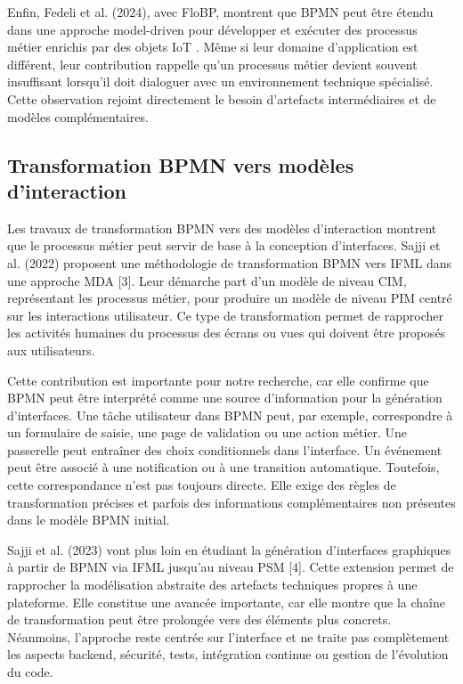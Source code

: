 Enfin, Fedeli et al. (2024), avec FloBP, montrent que BPMN peut être étendu dans une approche model-driven pour développer et exécuter des processus métier enrichis par des objets IoT \cite{fedeli2024}. Même si leur domaine d'application est différent, leur contribution rappelle qu'un processus métier devient souvent insuffisant lorsqu'il doit dialoguer avec un environnement technique spécialisé. Cette observation rejoint directement le besoin d'artefacts intermédiaires et de modèles complémentaires.


\subsection{Transformation BPMN vers modèles d'interaction}

Les travaux de transformation BPMN vers des modèles d'interaction montrent que le processus métier peut servir de base à la conception d'interfaces. Sajji et al. (2022) proposent une méthodologie de transformation BPMN vers IFML dans une approche MDA [3]. Leur démarche part d'un modèle de niveau CIM, représentant les processus métier, pour produire un modèle de niveau PIM centré sur les interactions utilisateur. Ce type de transformation permet de rapprocher les activités humaines du processus des écrans ou vues qui doivent être proposés aux utilisateurs.

Cette contribution est importante pour notre recherche, car elle confirme que BPMN peut être interprété comme une source d'information pour la génération d'interfaces. Une tâche utilisateur dans BPMN peut, par exemple, correspondre à un formulaire de saisie, une page de validation ou une action métier. Une passerelle peut entraîner des choix conditionnels dans l'interface. Un événement peut être associé à une notification ou à une transition automatique. Toutefois, cette correspondance n'est pas toujours directe. Elle exige des règles de transformation précises et parfois des informations complémentaires non présentes dans le modèle BPMN initial.

Sajji et al. (2023) vont plus loin en étudiant la génération d'interfaces graphiques à partir de BPMN via IFML jusqu'au niveau PSM [4]. Cette extension permet de rapprocher la modélisation abstraite des artefacts techniques propres à une plateforme. Elle constitue une avancée importante, car elle montre que la chaîne de transformation peut être prolongée vers des éléments plus concrets. Néanmoins, l'approche reste centrée sur l'interface et ne traite pas complètement les aspects backend, sécurité, tests, intégration continue ou gestion de l'évolution du code.

